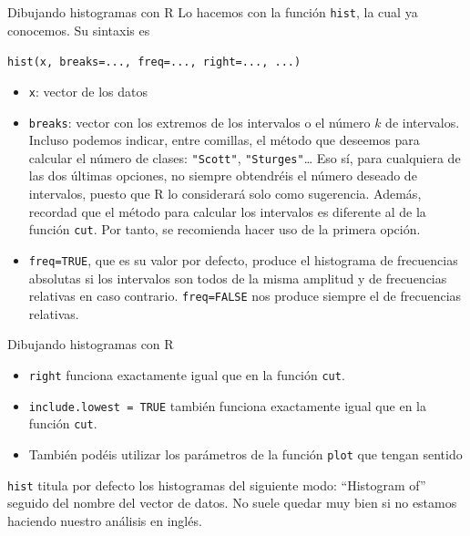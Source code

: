 \documentclass[
  ignorenonframetext,
  aspectratio=169]{beamer}
\providecommand{\tightlist}{%
  \setlength{\itemsep}{0pt}\setlength{\parskip}{0pt}}
\begin{document}
\begin{frame}[fragile]{Dibujando histogramas con R}
\label{dibujando-histogramas-con-r}
Lo hacemos con la función \texttt{hist}, la cual ya conocemos. Su
sintaxis es

\texttt{hist(x,\ breaks=...,\ freq=...,\ right=...,\ ...)}

\begin{itemize}
\tightlist
\item
  \texttt{x}: vector de los datos
\item
  \texttt{breaks}: vector con los extremos de los intervalos o el número
  \(k\) de intervalos. Incluso podemos indicar, entre comillas, el
  método que deseemos para calcular el número de clases:
  \texttt{"Scott"}, \texttt{"Sturges"}\ldots{} Eso sí, para cualquiera
  de las dos últimas opciones, no siempre obtendréis el número deseado
  de intervalos, puesto que R lo considerará solo como sugerencia.
  Además, recordad que el método para calcular los intervalos es
  diferente al de la función \texttt{cut}. Por tanto, se recomienda
  hacer uso de la primera opción.
\item
  \texttt{freq=TRUE}, que es su valor por defecto, produce el histograma
  de frecuencias absolutas si los intervalos son todos de la misma
  amplitud y de frecuencias relativas en caso contrario.
  \texttt{freq=FALSE} nos produce siempre el de frecuencias relativas.
\end{itemize}
\end{frame}

\begin{frame}[fragile]{Dibujando histogramas con R}
\label{dibujando-histogramas-con-r-1}
\begin{itemize}
\tightlist
\item
  \texttt{right} funciona exactamente igual que en la función
  \texttt{cut}.
\item
  \texttt{include.lowest\ =\ TRUE} también funciona exactamente igual
  que en la función \texttt{cut}.
\item
  También podéis utilizar los parámetros de la función \texttt{plot} que
  tengan sentido
\end{itemize}

\texttt{hist} titula por defecto los histogramas del siguiente modo:
``Histogram of'' seguido del nombre del vector de datos. No suele quedar
muy bien si no estamos haciendo nuestro análisis en inglés.
\end{frame}
\end{document}
